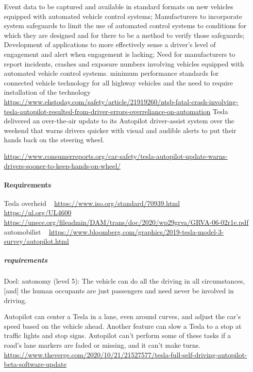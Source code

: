 \documentclass{article}
\begin{document}
Event data to be captured and available in standard formats on new vehicles equipped with automated vehicle control systems;
Manufacturers to incorporate system safeguards to limit the use of automated control systems to conditions for which they are designed and for there to be a method to verify those safeguards;
Development of applications to more effectively sense a driver’s level of engagement and alert when engagement is lacking;
Need for manufacturers to report incidents, crashes and exposure numbers involving vehicles equipped with automated vehicle control systems.
minimum performance standards for connected vehicle technology for all highway vehicles and the need to require installation of the technology
~\cite{ntsbreportfsd}
\url{https://www.ehstoday.com/safety/article/21919260/ntsb-fatal-crash-involving-tesla-autopilot-resulted-from-driver-errors-overreliance-on-automation}
Tesla delivered an over-the-air update to its Autopilot driver-assist system over the weekend that warns drivers quicker with visual and audible alerts to put their hands back on the steering wheel.


\url{https://www.consumerreports.org/car-safety/tesla-autopilot-update-warns-drivers-sooner-to-keep-hands-on-wheel/}



\paragraph{Requirements}
Tesla
overheid
~\cite{isostandard}
\url{https://www.iso.org/standard/70939.html}
~\cite{ieeeseries}
\url{https://ul.org/UL4600}
~\cite{unece}
\url{https://unece.org/fileadmin/DAM/trans/doc/2020/wp29grva/GRVA-06-02r1e.pdf}
automobilist ~\cite{teslaautopilot}
\url{https://www.bloomberg.com/graphics/2019-tesla-model-3-survey/autopilot.html}


\subparagraph{requirements}
Doel: autonomy (level 5): The vehicle can do all the driving in all circumstances, [and] the human occupants are just passengers and need never be involved in driving.

Autopilot can center a Tesla in a lane, even around curves, and adjust the car’s speed based on the vehicle ahead.
Another feature can slow a Tesla to a stop at traffic lights and stop signs. 
Autopilot can’t perform some of these tasks if a road’s lane markers are faded or missing, and it can’t make turns.
~\cite{thevergetesla}
\url{https://www.theverge.com/2020/10/21/21527577/tesla-full-self-driving-autopilot-beta-software-update}
\end{document}
